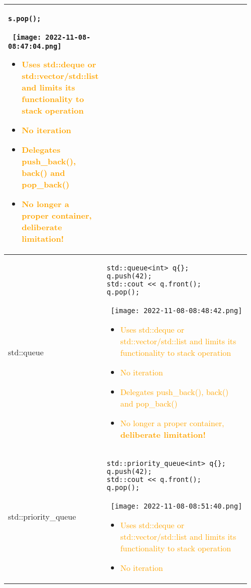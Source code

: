 \documentclass[main.tex,fontsize=8pt,paper=a4,paper=portrait,DIV=calc,]{scrartcl}
\begin{document}
\begin{table}[ht!]
\begin{tabular}{|m{0.2\linewidth}|m{0.755\linewidth}|}
\begin{lstlisting}
s.pop();
\end{lstlisting}
\, \newline
\texttt{[image: 2022-11-08-08:47:04.png]}\newline
\begin{itemize}
\item \textcolor{orange}{Uses std::deque or std::vector/std::list and limits its functionality to stack operation}
\item \textcolor{orange}{No iteration}
\item \textcolor{orange}{Delegates push\_back(), back() and pop\_back()}
\item \textcolor{orange}{No longer a proper container, \textbf{deliberate limitation!}}
\vspace{-2mm}
\end{itemize}\\
\hline
std::queue & 
\begin{lstlisting}
std::queue<int> q{};
q.push(42);
std::cout << q.front();
q.pop();
\end{lstlisting}
\, \newline
\texttt{[image: 2022-11-08-08:48:42.png]}\newline
\begin{itemize}
\item \textcolor{orange}{Uses std::deque or std::vector/std::list and limits its functionality to stack operation}
\item \textcolor{orange}{No iteration}
\item \textcolor{orange}{Delegates push\_back(), back() and pop\_back()}
\item \textcolor{orange}{No longer a proper container, \textbf{deliberate limitation!}}
\vspace{-2mm}
\end{itemize}\\
\hline
std::priority\_queue & 
\begin{lstlisting}
std::priority_queue<int> q{};
q.push(42);
std::cout << q.front();
q.pop();
\end{lstlisting}
\, \newline
\texttt{[image: 2022-11-08-08:51:40.png]}\newline
\begin{itemize}
\item \textcolor{orange}{Uses std::deque or std::vector/std::list and limits its functionality to stack operation}
\item \textcolor{orange}{No iteration}

\end{itemize}
\end{tabular}
\end{table}
\end{document}
